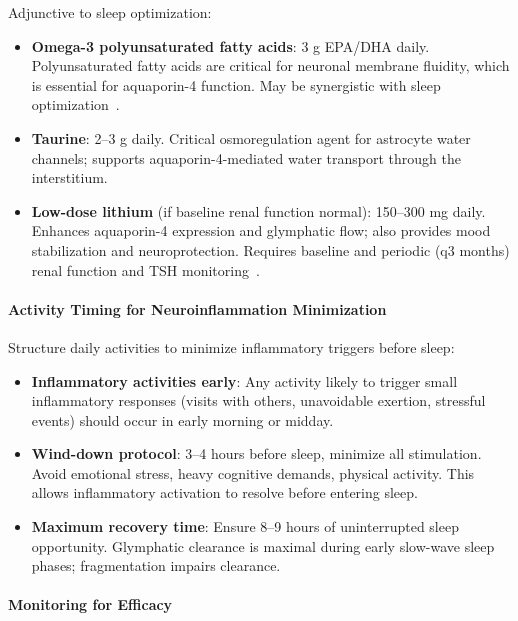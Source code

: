 \begin{protocol}
Adjunctive to sleep optimization:
\begin{itemize}
    \item \textbf{Omega-3 polyunsaturated fatty acids}: 3 g EPA/DHA daily. Polyunsaturated fatty acids are critical for neuronal membrane fluidity, which is essential for aquaporin-4 function. May be synergistic with sleep optimization~\cite{MCMC2024Neurometabolic}.

    \item \textbf{Taurine}: 2--3 g daily. Critical osmoregulation agent for astrocyte water channels; supports aquaporin-4-mediated water transport through the interstitium.

    \item \textbf{Low-dose lithium} (if baseline renal function normal): 150--300 mg daily. Enhances aquaporin-4 expression and glymphatic flow; also provides mood stabilization and neuroprotection. Requires baseline and periodic (q3 months) renal function and TSH monitoring~\cite{MCMC2024Neurometabolic}.
\end{itemize}

\paragraph{Activity Timing for Neuroinflammation Minimization}

Structure daily activities to minimize inflammatory triggers before sleep:
\begin{itemize}
    \item \textbf{Inflammatory activities early}: Any activity likely to trigger small inflammatory responses (visits with others, unavoidable exertion, stressful events) should occur in early morning or midday.

    \item \textbf{Wind-down protocol}: 3--4 hours before sleep, minimize all stimulation. Avoid emotional stress, heavy cognitive demands, physical activity. This allows inflammatory activation to resolve before entering sleep.

    \item \textbf{Maximum recovery time}: Ensure 8--9 hours of uninterrupted sleep opportunity. Glymphatic clearance is maximal during early slow-wave sleep phases; fragmentation impairs clearance.
\end{itemize}

\paragraph{Monitoring for Efficacy}


\end{protocol}
